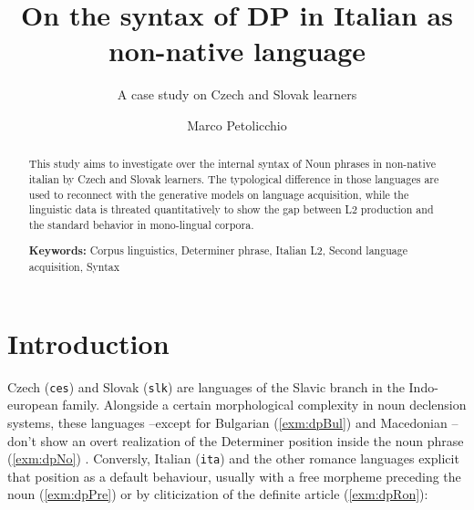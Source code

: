 \documentclass[a4paper,twoside,12pt,chapterprefix=false,listof=flat]{scrartcl}
\title{On the syntax of DP in Italian as non-native language}
\subtitle{A case study on Czech and Slovak learners}
\author{Marco Petolicchio}
\date{}
\theoremstyle{plain} %
\theoremstyle{definition}
\theoremstyle{remark}
\begin{document}
\maketitle
\begin{abstract}
This study aims to investigate over the internal syntax of Noun phrases
in non-native italian by Czech and Slovak learners. The typological
difference in those languages are used to reconnect with the generative
models on language acquisition, while the linguistic data is threated
quantitatively to show the gap between L2 production and the standard
behavior in mono-lingual corpora.

\par

\textbf{Keywords:} Corpus linguistics, Determiner phrase, Italian L2,
Second language acquisition, Syntax
\end{abstract}

{
\setcounter{tocdepth}{2}
\tableofcontents
}
\clearpage

\hypertarget{introduction}{%
\section{Introduction}\label{introduction}}

Czech (\texttt{ces}) and Slovak (\texttt{slk}) are languages of the
Slavic branch in the Indo-european family. Alongside a certain
morphological complexity in noun declension systems, these languages
--except for Bulgarian (\ref{exm:dpBul}) and Macedonian
\citep{wals-37}-- don't show an overt realization of the Determiner
position inside the noun phrase (\ref{exm:dpNo}) \citep{harkins1953}.
Conversly, Italian (\texttt{ita}) and the other romance languages
explicit that position as a default behaviour, usually with a free
morpheme preceding the noun (\ref{exm:dpPre}) or by cliticization of the
definite article (\ref{exm:dpRon}):
\end{document}
